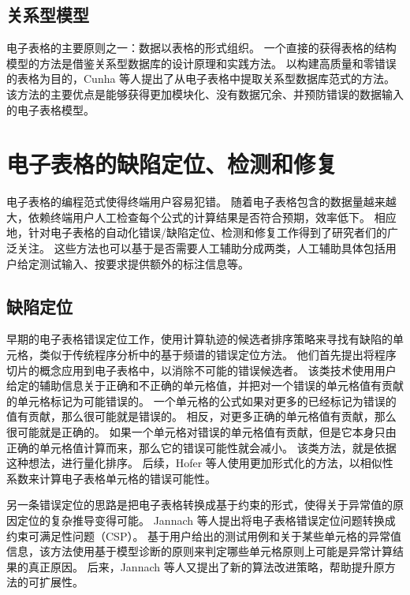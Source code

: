 \subsection{关系型模型}
电子表格的主要原则之一：数据以表格的形式组织。
一个直接的获得表格的结构模型的方法是借鉴关系型数据库的设计原理和实践方法。
以构建高质量和零错误的表格为目的，Cunha 等人\cite{cunha2009spreadsheets}提出了从电子表格中提取关系型数据库范式的方法。
该方法的主要优点是能够获得更加模块化、没有数据冗余、并预防错误的数据输入的电子表格模型\cite{cunha2009discovery,cunha2012relational}。


\section{电子表格的缺陷定位、检测和修复}
电子表格的编程范式使得终端用户容易犯错。
随着电子表格包含的数据量越来越大，依赖终端用户人工检查每个公式的计算结果是否符合预期，效率低下。
相应地，针对电子表格的自动化错误/缺陷定位、检测和修复工作得到了研究者们的广泛关注。
这些方法也可以基于是否需要人工辅助分成两类，人工辅助具体包括用户给定测试输入、按要求提供额外的标注信息等。

\subsection{缺陷定位}
早期的电子表格错误定位工作\cite{reichwein1999slicing,ruthruff2005interactive}，使用计算轨迹的候选者排序策略来寻找有缺陷的单元格，类似于传统程序分析中的基于频谱的错误定位方法。
他们首先提出将程序切片的概念应用到电子表格中，以消除不可能的错误候选者。
该类技术使用用户给定的辅助信息关于正确和不正确的单元格值，并把对一个错误的单元格值有贡献的单元格标记为可能错误的。
一个单元格的公式如果对更多的已经标记为错误的值有贡献，那么很可能就是错误的。
相反，对更多正确的单元格值有贡献，那么很可能就是正确的。
如果一个单元格对错误的单元格值有贡献，但是它本身只由正确的单元格值计算而来，那么它的错误可能性就会减小。
该类方法，就是依据这种想法，进行量化排序。
后续，Hofer 等人\cite{hofer2013empirical}使用更加形式化的方法，以相似性系数来计算电子表格单元格的错误可能性。

另一条错误定位的思路是把电子表格转换成基于约束的形式，使得关于异常值的原因定位的复杂推导变得可能。
Jannach 等人\cite{jannach2010toward}提出将电子表格错误定位问题转换成约束可满足性问题（CSP）\cite{tsang2014foundations}。
基于用户给出的测试用例和关于某些单元格的异常值信息，该方法使用基于模型诊断的原则来判定哪些单元格原则上可能是异常计算结果的真正原因。
后来，Jannach 等人\cite{jannach2016model}又提出了新的算法改进策略，帮助提升原方法的可扩展性。

